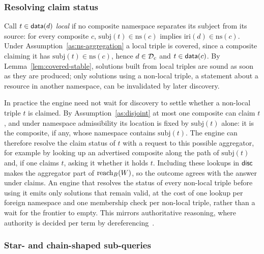 \subsubsection{Resolving claim status}
\label{sec:claim-status}

Call $t \in \mathsf{data}(d)$ \emph{local} if no composite namespace separates its subject from
its source: for every composite $c$, $\mathrm{subj}(t) \in \mathrm{ns}(c)$ implies
$\mathrm{iri}(d) \in \mathrm{ns}(c)$. Under Assumption~\ref{as:ns-aggregation} a local
triple is covered, since a composite claiming it has $\mathrm{subj}(t) \in \mathrm{ns}(c)$,
hence $d \in \mathcal{D}_c$ and $t \in \mathsf{data}(c)$. By Lemma~\ref{lem:covered-stable}, solutions
built from local triples are sound as soon as they are produced; only solutions using a
non-local triple, a statement about a resource in another namespace, can be invalidated
by later discovery.

\begin{remark}
\label{rem:claim-lookup}
In practice the engine need not wait for discovery to settle whether a non-local triple
$t$ is claimed. By Assumption~\ref{as:disjoint} at most one composite can claim $t$, and
under namespace admissibility its location is fixed by $\mathrm{subj}(t)$ alone: it is the
composite, if any, whose namespace contains $\mathrm{subj}(t)$. The engine can therefore
resolve the claim status of $t$ with a request to this possible aggregator, for example
by looking up an advertised composite along the path of $\mathrm{subj}(t)$ and, if one
claims $t$, asking it whether it holds $t$. Including these lookups in $\mathsf{disc}$ makes the
aggregator part of $\mathrm{reach}_B(W)$, so the outcome agrees with the answer under claims. An
engine that resolves the status of every non-local triple before using it emits only
solutions that remain valid, at the cost of one lookup per foreign namespace and one
membership check per non-local triple, rather than a wait for the frontier to empty.
This mirrors authoritative reasoning, where authority is decided per term by
dereferencing~\cite{hogan2009authoritative}.~
\end{remark}

\subsubsection{Star- and chain-shaped sub-queries}
\label{sec:shapes}

